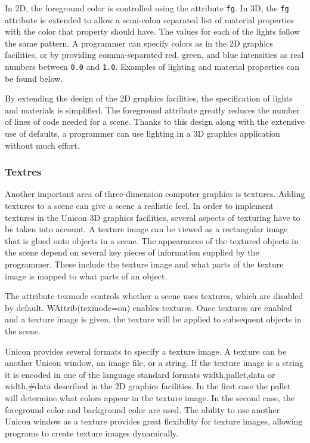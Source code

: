 In 2D, the foreground color is controlled using the attribute \texttt{fg}.
In 3D, the \texttt{fg} attribute is extended to allow a
semi-colon separated list of material properties with the color that
property should have. The values for each of the lights follow the same
pattern. A programmer can specify colors as in the 2D graphics
facilities, or by providing comma-separated red, green, and blue
intensities as real numbers between \texttt{0.0} and \texttt{1.0}.
Examples of lighting and material properties can be found below.

By extending the design of the 2D graphics facilities, the specification
of lights and materials is simplified. The foreground attribute greatly
reduces the number of lines of code needed for a scene. Thanks to this
design along with the extensive use of defaults, a programmer can use
lighting in a 3D graphics application without much effort.

\subsubsection[Textures]{Textres}
Another important area of three-dimension computer graphics is textures.
Adding textures to a scene can give a scene a realistic feel. In order
to implement textures in the Unicon 3D graphics facilities, several
aspects of texturing have to be taken into account. A texture image can
be viewed as a rectangular image that is
{\textquotedbl}glued{\textquotedbl} onto objects in a scene. The
appearances of the textured objects in the scene depend on several key
pieces of information supplied by the programmer. These include the
texture image and what parts of the texture image is mapped to what
parts of an object.

The attribute texmode controls whether a scene uses textures, which are
disabled by default.
WAttrib({\textquotedbl}texmode=on{\textquotedbl}) enables textures.
Once textures are enabled and a texture image is given, the texture
will be applied to subsequent objects in the scene. 

Unicon provides several formats to specify a texture image. A texture
can be another Unicon window, an image file, or a string. If the
texture image is a string it is encoded in one of the language standard
formats {\textquotedbl}width,pallet,data{\textquotedbl} or
{\textquotedbl}width,\#data{\textquotedbl} described in the 2D graphics
facilities. In the first case the pallet will determine what colors
appear in the texture image. In the second case, the foreground color
and background color are used. The ability to use another Unicon
window as a texture provides great flexibility for texture images,
allowing programs to create texture images dynamically.

